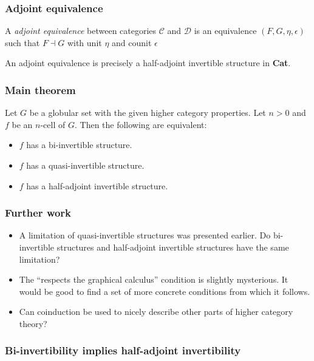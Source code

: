 \documentclass[presentation]{beamer}
\begin{document}
\begin{frame}
  \frametitle{Adjoint equivalence}
  \begin{definition}
    A \emph{adjoint equivalence} between categories \(\mathcal C\) and \(\mathcal D\) is an equivalence \((F,G,\eta,\epsilon)\) such that \(F \dashv G\) with unit \(\eta\) and counit \(\epsilon\)
  \end{definition}

  \pause{}
  An adjoint equivalence is precisely a half-adjoint invertible structure in \textbf{Cat}.
\end{frame}

\begin{frame}
  \frametitle{Main theorem}

  \begin{theorem}
  Let \(G\) be a globular set with the given higher category properties. Let \(n > 0\) and \(f\) be an \(n\)-cell of \(G\). Then the following are equivalent:
  \begin{itemize}
  \item \(f\) has a bi-invertible structure.
  \item \(f\) has a quasi-invertible structure.
  \item \(f\) has a half-adjoint invertible structure.
  \end{itemize}
\end{theorem}
\end{frame}

\begin{frame}
  \frametitle{Further work}
  \begin{itemize}
  \item A limitation of quasi-invertible structures was presented earlier. Do bi-invertible structures and half-adjoint invertible structures have the same limitation?
  \item The ``respects the graphical calculus'' condition is slightly mysterious. It would be good to find a set of more concrete conditions from which it follows.
  \item Can coinduction be used to nicely describe other parts of higher category theory?
  \end{itemize}
\end{frame}

\begin{frame}
  \frametitle{Bi-invertibility implies half-adjoint invertibility}
\end{frame}
\end{document}
